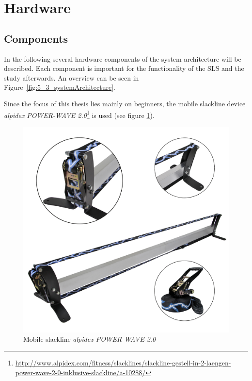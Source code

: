 \section{Hardware}\label{5_1_systemSetup}
\subsection{Components}\label{5_1_hardwareComponents}
In the following several hardware components of the system architecture will be described. Each component is important for the functionality of the SLS and the study afterwards. An overview can be seen in Figure~\ref{fig:5_3_systemArchitecture}.

Since the focus of this thesis lies mainly on beginners, the mobile slackline device \textit{alpidex POWER-WAVE 2.0}\footnote{\url{http://www.alpidex.com/fitness/slacklines/slackline-gestell-in-2-laengen-power-wave-2-0-inklusive-slackline/a-10288/}} is used (see figure \ref{fig:5_1_mobileSlackline}).

\begin{figure}[htb]
	\centering
	\begin{minipage}[t]{1\linewidth}
		\centering
		\includegraphics[width=0.44\linewidth]{Pictures/5_1_mobileSlackline}
		\caption{Mobile slackline \textit{alpidex POWER-WAVE 2.0}~\cite{alpidex2017-ms}}
		\label{fig:5_1_mobileSlackline}
	\end{minipage}
\end{figure}

